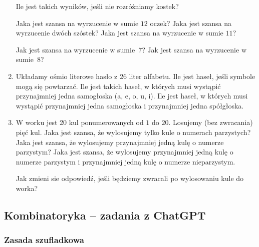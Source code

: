 \documentclass[12pt]{article}
\begin{document}
\begin{enumerate}
	Ile jest takich wyników, jeśli nie rozróżniamy kostek?
	
	Jaka jest szansa na wyrzucenie w sumie $12$ oczek? Jaka jest 
	szansa na wyrzucenie dwóch szóstek?
	Jaka jest szansa na wyrzucenie w sumie $11$?
	
	Jak jest szansa na wyrzucenie w sumie~$7$?
	Jak jest szansa na wyrzucenie w sumie~$8$?
	
	\item 
	Układamy ośmio literowe hasło z 26 liter alfabetu. Ile jest haseł, jeśli symbole mogą 
	się powtarzać. Ile jest takich haseł, w których musi wystąpić przynajmniej jedna 
	samogłoska (a, e, o, u, i). Ile jest haseł, w których musi wystąpić przynajmniej 
	jedna samogłoska i przynajmniej jedna spółgłoska.
	
	\item 
	W worku jest 20 kul ponumerowanych od $1$ do $20$. Losujemy (bez zwracania) pięć kul.
	Jaka jest szansa, że wylosujemy tylko kule o numerach parzystych?
	Jaka jest szansa, że wylosujemy przynajmniej jedną kulę o numerze parzystym?
	Jaka jest szansa, że wylosujemy przynajmniej jedną kulę o numerze parzystym
	i przynajmniej jedną kulę o numerze nieparzystym.
	
	Jak zmieni sie odpowiedź, jeśli będziemy zwracali po wylosowaniu kule do worka?
	
	
\end{enumerate}


\subsection{Kombinatoryka -- zadania z ChatGPT}

\subsubsection{Zasada szufladkowa}
\end{document}
